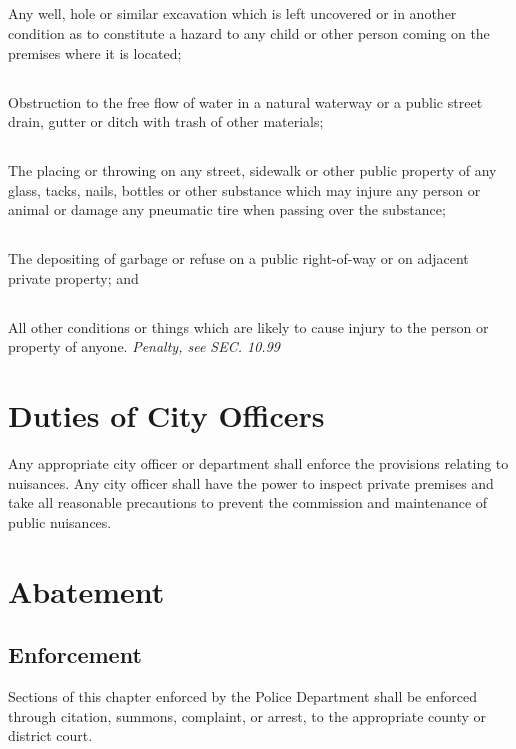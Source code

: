 \subsection{}
 Any well, hole or similar excavation which is left uncovered or in another condition as to constitute a hazard to any child or other person coming on the premises where it is located;
\subsection{}
 Obstruction to the free flow of water in a natural waterway or a public street drain, gutter or ditch with trash of other materials;
\subsection{}
 The placing or throwing on any street, sidewalk or other public property of any glass, tacks, nails, bottles or other substance which may injure any person or animal or damage any pneumatic tire when passing over the substance;
\subsection{}
 The depositing of garbage or refuse on a public right-of-way or on adjacent private property; and
\subsection{}
 All other conditions or things which are likely to cause injury to the person or property of anyone.
\emph{Penalty, see SEC. 10.99}
\section{Duties of City Officers}
Any appropriate city officer or department shall enforce the provisions relating to nuisances.  Any city officer shall have the power to inspect private premises and take all reasonable precautions to prevent the commission and maintenance of public nuisances.
\section{Abatement}
\subsection{Enforcement}
Sections of this chapter enforced by the Police Department shall be enforced through citation, summons, complaint, or arrest, to the appropriate county or district court.
